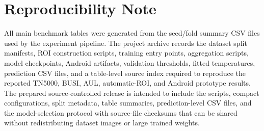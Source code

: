 \section{Reproducibility Note}
\label{sec:appendix_sources}

All main benchmark tables were generated from the seed/fold summary CSV files used by the experiment pipeline. The project archive records the dataset split manifests, ROI construction scripts, training entry points, aggregation scripts, model checkpoints, Android artifacts, validation thresholds, fitted temperatures, prediction CSV files, and a table-level source index required to reproduce the reported TN5000, BUSI, AUL, automatic-ROI, and Android prototype results. The prepared source-controlled release is intended to include the scripts, compact configurations, split metadata, table summaries, prediction-level CSV files, and the model-selection protocol with source-file checksums that can be shared without redistributing dataset images or large trained weights.
